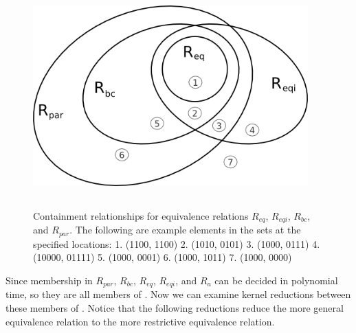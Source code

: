 \documentclass[draft]{article}
\theoremstyle{definition}
\begin{document}
\begin{figure}
  \begin{center}
    \includegraphics[width=300pt,height=241pt,keepaspectratio=true]
                    {containments.png}
  \end{center}
  \caption{ \label{fig:containments} Containment relationships for equivalence
    relations $R_{eq}$, $R_{eqi}$, $R_{bc}$, and $R_{par}$. The following are
    example elements in the sets at the specified locations: 1. (1100, 1100)
    2. (1010, 0101) 3. (1000, 0111) 4. (10000, 01111) 5. (1000, 0001) 6. (1000,
    1011) 7. (1000, 0000) }
\end{figure}

Since membership in $R_{par}$, $R_{bc}$, $R_{eq}$, $R_{eqi}$, and $R_a$ can be
decided in polynomial time, so they are all members of \PEq. Now we can examine
kernel reductions between these members of \PEq. Notice that the following
reductions reduce the more general equivalence relation to the more restrictive
equivalence relation.
\end{document}
